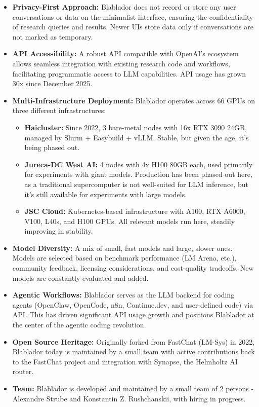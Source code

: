 \documentclass[10pt,conference]{IEEEtran}
\begin{document}
\begin{itemize}
    \item \textbf{Privacy-First Approach:} Blablador does not record or store any user conversations or data on the minimalist interface, ensuring the confidentiality of research queries and results. Newer UIs store data only if conversations are not marked as temporary.
    
    \item \textbf{API Accessibility:} A robust API compatible with OpenAI's ecosystem allows seamless integration with existing research code and workflows, facilitating programmatic access to LLM capabilities. API usage has grown 30x since December 2025.
    
    \item \textbf{Multi-Infrastructure Deployment:} Blablador operates across 66 GPUs on three different infrastructures:
    \begin{itemize}
        \item \textbf{Haicluster:} Since 2022, 3 bare-metal nodes with 16x RTX 3090 24GB, managed by Slurm + Easybuild + vLLM. Stable, but given the age, it's being phased out.
        \item \textbf{Jureca-DC West AI:} 4 nodes with 4x H100 80GB each, used primarily for experiments with giant models. Production has been phased out here, as a traditional supercomputer is not well-suited for LLM inference, but it's still available for experiments with large models.
        \item \textbf{JSC Cloud:} Kubernetes-based infrastructure with A100, RTX A6000, V100, L40s, and H100 GPUs. All relevant models run here, steadily improving in stability.
    \end{itemize}
    
    \item \textbf{Model Diversity:} A mix of small, fast models and large, slower ones. Models are selected based on benchmark performance (LM Arena, etc.), community feedback, licensing considerations, and cost-quality tradeoffs. New models are constantly evaluated and added.
    
    \item \textbf{Agentic Workflows:} Blablador serves as the LLM backend for coding agents (OpenClaw, OpenCode, n8n, Continue.dev, and user-defined code) via API. This has driven significant API usage growth and positions Blablador at the center of the agentic coding revolution.
    
    \item \textbf{Open Source Heritage:} Originally forked from FastChat (LM-Sys) in 2022, Blablador today is maintained by a small team with active contributions back to the FastChat project and integration with Synapse, the Helmholtz AI router.
    
    \item \textbf{Team:} Blablador is developed and maintained by a small team of 2 persons - Alexandre Strube and Konstantin Z. Rushchanskii, with hiring in progress.
\end{itemize}
\end{document}
